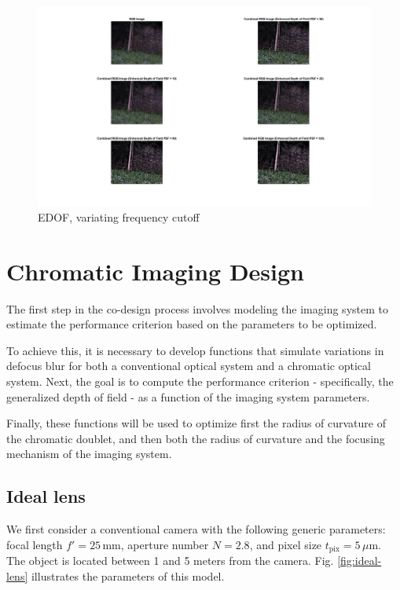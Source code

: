 \documentclass[10pt,letterpaper]{article}
\begin{document}
\begin{figure}[h]
	\centering
	\includegraphics[scale=0.25]{PSF variating EDOF RGB.png}
	\caption{EDOF, variating frequency cutoff}
	\label{fig:cutoff}
\end{figure}


\section{Chromatic Imaging Design}
The first step in the co-design process involves modeling the imaging system to estimate the performance criterion based on the parameters to be optimized.

To achieve this, it is necessary to develop functions that simulate variations in defocus blur for both a conventional optical system and a chromatic optical system. Next, the goal is to compute the performance criterion - specifically, the generalized depth of field - as a function of the imaging system parameters.

Finally, these functions will be used to optimize first the radius of curvature of the chromatic doublet, and then both the radius of curvature and the focusing mechanism of the imaging system.

\subsection*{Ideal lens}
We first consider a conventional camera with the following generic parameters: focal length $f' = 25 \, \text{mm}$, aperture number $N = 2.8$, and pixel size $t_{\text{pix}} = 5 \, \mu\text{m}$. The object is located between 1 and 5 meters from the camera. Fig. \ref{fig:ideal-lens} illustrates the parameters of this model.
\end{document}
